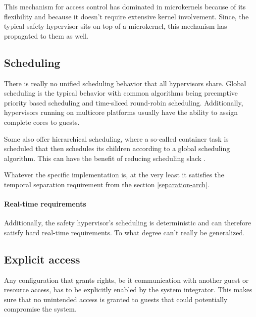 This mechanism for access control has dominated in microkernels because of its flexibility and because it doesn't require extensive kernel involvement. Since, the typical safety hypervisor sits on top of a microkernel, this mechanism has propagated to them as well.

\subsection{Scheduling}
There is really no unified scheduling behavior that all hypervisors share. Global scheduling is the typical behavior with common algorithms being preemptive priority based scheduling and time-sliced round-robin scheduling. Additionally, hypervisors running on multicore platforms usually have the ability to assign complete cores to guests.

Some also offer hierarchical scheduling, where a so-called container task is scheduled that then schedules its children according to a global scheduling algorithm. This can have the benefit of reducing scheduling slack \cite{MalcolmS.Mollison.2010}. 

Whatever the specific implementation is, at the very least it satisfies the temporal separation requirement from the section \ref{separation-arch}. 

\paragraph{Real-time requirements}
Additionally, the safety hypervisor's scheduling is deterministic and can therefore satisfy hard real-time requirements. To what degree can't really be generalized.
\begin{comment}
\subsection{Static configuration}
Any mechanism to increase a guests rights at runtime poses the risk of exploitation, be it accidental or purposeful. That is why these systems are typically statically configured and if configuration runtime is at all possible, it is restricted to reducing privilege. For example, a guest that is allowed to spawn other guests may give them his own rights or less than his own but never more.
\end{comment}

\subsection{Explicit access}
Any configuration that grants rights, be it communication with another guest or resource access, has to be explicitly enabled by the system integrator. This makes sure that no unintended access is granted to guests that could potentially compromise the system.
